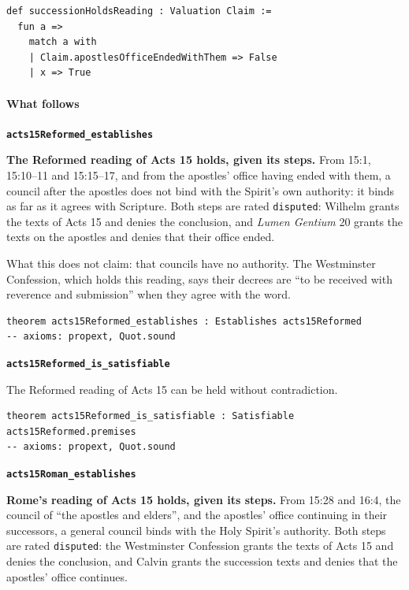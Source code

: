 \documentclass[11pt]{article}
\begin{document}
{\small\begin{verbatim}
def successionHoldsReading : Valuation Claim :=
  fun a =>
    match a with
    | Claim.apostlesOfficeEndedWithThem => False
    | x => True
\end{verbatim}}
\paragraph*{What follows}
\leavevmode\par\nobreak
\par\medskip\noindent\textbf{\texttt{acts15\allowbreak{}Reformed\_\allowbreak{}establishes}}\par\nobreak\noindent
\textbf{The Reformed reading of Acts 15 holds, given its steps.} From 15:1, 15:10–11 and 15:15–17, and from the apostles’ office having ended with them, a council after the apostles does not bind with the Spirit’s own authority: it binds as far as it agrees with Scripture. Both steps are rated \texttt{disputed}: Wilhelm grants the texts of Acts 15 and denies the conclusion, and \emph{Lumen Gentium} 20 grants the texts on the apostles and denies that their office ended.

What this does not claim: that councils have no authority. The Westminster Confession, which holds this reading, says their decrees are “to be received with reverence and submission” when they agree with the word.

{\small\begin{verbatim}
theorem acts15Reformed_establishes : Establishes acts15Reformed
-- axioms: propext, Quot.sound
\end{verbatim}}
\par\medskip\noindent\textbf{\texttt{acts15\allowbreak{}Reformed\_\allowbreak{}is\_\allowbreak{}satisfiable}}\par\nobreak\noindent
The Reformed reading of Acts 15 can be held without contradiction.

{\small\begin{verbatim}
theorem acts15Reformed_is_satisfiable : Satisfiable acts15Reformed.premises
-- axioms: propext, Quot.sound
\end{verbatim}}
\par\medskip\noindent\textbf{\texttt{acts15\allowbreak{}Roman\_\allowbreak{}establishes}}\par\nobreak\noindent
\textbf{Rome’s reading of Acts 15 holds, given its steps.} From 15:28 and 16:4, the council of “the apostles and elders”, and the apostles’ office continuing in their successors, a general council binds with the Holy Spirit’s authority. Both steps are rated \texttt{disputed}: the Westminster Confession grants the texts of Acts 15 and denies the conclusion, and Calvin grants the succession texts and denies that the apostles’ office continues.
\end{document}
